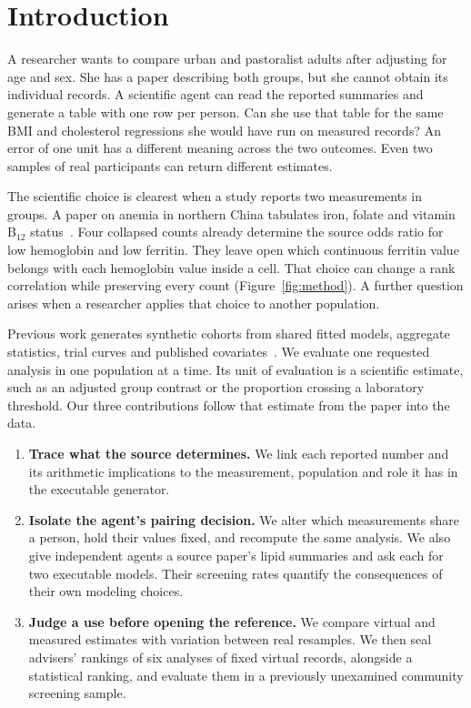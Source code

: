 \documentclass[sigconf,anonymous,review]{acmart}
\begin{document}
\section{Introduction}
A researcher wants to compare urban and pastoralist adults after adjusting for age and sex. She has a paper describing both groups, but she cannot obtain its individual records. A scientific agent can read the reported summaries and generate a table with one row per person. Can she use that table for the same BMI and cholesterol regressions she would have run on measured records? An error of one unit has a different meaning across the two outcomes. Even two samples of real participants can return different estimates.

The scientific choice is clearest when a study reports two measurements in groups. A paper on anemia in northern China tabulates iron, folate and vitamin B$_{12}$ status~\cite{zhu}. Four collapsed counts already determine the source odds ratio for low hemoglobin and low ferritin. They leave open which continuous ferritin value belongs with each hemoglobin value inside a cell. That choice can change a rank correlation while preserving every count (Figure~\ref{fig:method}). A further question arises when a researcher applies that choice to another population.

Previous work generates synthetic cohorts from shared fitted models, aggregate statistics, trial curves and published covariates~\cite{filshtein,llmsynthor,synthipd,kmgen}. We evaluate one requested analysis in one population at a time. Its unit of evaluation is a scientific estimate, such as an adjusted group contrast or the proportion crossing a laboratory threshold. Our three contributions follow that estimate from the paper into the data.
\begin{enumerate}
\item \textbf{Trace what the source determines.} We link each reported number and its arithmetic implications to the measurement, population and role it has in the executable generator.
\item \textbf{Isolate the agent's pairing decision.} We alter which measurements share a person, hold their values fixed, and recompute the same analysis. We also give independent agents a source paper's lipid summaries and ask each for two executable models. Their screening rates quantify the consequences of their own modeling choices.
\item \textbf{Judge a use before opening the reference.} We compare virtual and measured estimates with variation between real resamples. We then seal advisers' rankings of six analyses of fixed virtual records, alongside a statistical ranking, and evaluate them in a previously unexamined community screening sample.
\end{enumerate}
\end{document}
